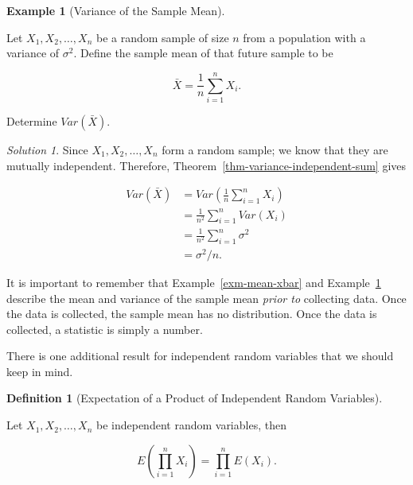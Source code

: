 \documentclass[
  letterpaper,
  DIV=11,
  numbers=noendperiod]{scrreprt}
\theoremstyle{definition}
\newtheorem{definition}{Definition}[chapter]
\theoremstyle{plain}
\theoremstyle{definition}
\newtheorem{example}{Example}[chapter]
\theoremstyle{remark}
\newtheorem*{solution}{Solution}
\begin{document}
\begin{example}[Variance of the Sample
Mean]\protect\hypertarget{exm-var-xbar}{}\label{exm-var-xbar}

Let \(X_1, X_2, \dotsc, X_n\) be a random sample of size \(n\) from a
population with a variance of \(\sigma^2\). Define the sample mean of
that future sample to be

\[\bar{X} = \frac{1}{n} \sum_{i=1}^{n} X_i.\]

Determine \(Var\left(\bar{X}\right)\).

\end{example}

\begin{solution}
Since \(X_1, X_2, \dotsc, X_n\) form a random sample; we know that they
are mutually independent. Therefore,
Theorem~\ref{thm-variance-independent-sum} gives

\[
\begin{aligned}
  Var\left(\bar{X}\right)
    &= Var\left(\frac{1}{n} \sum_{i=1}^{n} X_i\right) \\
    &= \frac{1}{n^2} \sum_{i=1}^{n} Var\left(X_i\right) \\
    &= \frac{1}{n^2} \sum_{i=1}^{n} \sigma^2 \\
    &= \sigma^2 / n.
\end{aligned}
\]
\end{solution}

\begin{tcolorbox}[enhanced jigsaw, rightrule=.15mm, leftrule=.75mm, opacityback=0, coltitle=black, bottomrule=.15mm, opacitybacktitle=0.6, left=2mm, colframe=quarto-callout-warning-color-frame, breakable, colback=white, arc=.35mm, toprule=.15mm, toptitle=1mm, bottomtitle=1mm, title=\textcolor{quarto-callout-warning-color}{\faExclamationTriangle}\hspace{0.5em}{Warning}, titlerule=0mm, colbacktitle=quarto-callout-warning-color!10!white]

It is important to remember that Example~\ref{exm-mean-xbar} and
Example~\ref{exm-var-xbar} describe the mean and variance of the sample
mean \emph{prior to} collecting data. Once the data is collected, the
sample mean has no distribution. Once the data is collected, a statistic
is simply a number.

\end{tcolorbox}

There is one additional result for independent random variables that we
should keep in mind.

\begin{definition}[Expectation of a Product of Independent Random
Variables]\protect\hypertarget{def-product-expectations}{}\label{def-product-expectations}

Let \(X_1, X_2, \dotsc, X_n\) be independent random variables, then

\[E\left(\prod_{i=1}^n X_i\right) = \prod_{i=1}^{n} E\left(X_i\right).\]

\end{definition}
\end{document}

